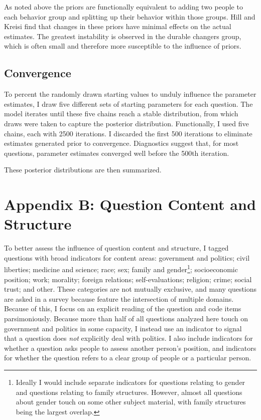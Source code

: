 \documentclass[12pt,]{article}
\begin{document}
As noted above the priors are functionally equivalent to adding two people to each behavior group and splitting up their behavior within those groups. Hill and Kreisi find that changes in these priors have minimal effects on the actual estimates. The greatest instability is observed in the durable changers group, which is often small and therefore more susceptible to the influence of priors.

\hypertarget{convergence}{%
\subsection{Convergence}\label{convergence}}

To percent the randomly drawn starting values to unduly influence the parameter estimates, I draw five different sets of starting parameters for each question. The model iterates until these five chains reach a stable distribution, from which draws were taken to capture the posterior distribution. Functionally, I used five chains, each with 2500 iterations. I discarded the first 500 iterations to eliminate estimates generated prior to convergence. Diagnostics suggest that, for most questions, parameter estimates converged well before the 500th iteration.

These posterior distributions are then summarized.

\hypertarget{appendix-b-question-content-and-structure}{%
\section{Appendix B: Question Content and Structure}\label{appendix-b-question-content-and-structure}}

To better assess the influence of question content and structure, I tagged questions with broad indicators for content areas: government and politics; civil liberties; medicine and science; race; sex; family and gender\footnote{Ideally I would include separate indicators for questions relating to gender and questions relating to family structures. However, almost all questions about gender touch on some other subject material, with family structures being the largest overlap.}; socioeconomic position; work; morality; foreign relations; self-evaluations; religion; crime; social trust; and other. These categories are not mutually exclusive, and many questions are asked in a survey because feature the intersection of multiple domains. Because of this, I focus on an explicit reading of the question and code items parsimoniously. Because more than half of all questions analyzed here touch on government and politics in some capacity, I instead use an indicator to signal that a question does \emph{not} explicitly deal with politics. I also include indicators for whether a question asks people to assess another person's position, and indicators for whether the question refers to a clear group of people or a particular person.
\end{document}
